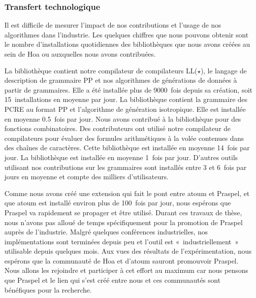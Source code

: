 \subsubsection{Transfert technologique}

Il est difficile de mesurer l'impact de nos contributions et l'usage de nos
algorithmes dans l'industrie. Les quelques chiffres que nous pouvons obtenir
sont le nombre d'installations quotidiennes des bibliothèques que nous avons
créées au sein de Hoa ou auxquelles nous avons contribuées.

La bibliothèque  contient notre compilateur de
compilateurs LL($\star$), le langage de description de grammaire PP et nos
algorithmes de générations de données à partir de grammaires. Elle a été
installée plus de 9000~fois depuis sa création, soit 15~installations en moyenne
par jour. La bibliothèque  contient la grammaire des
PCRE au format PP et l'algorithme de génération isotropique. Elle est installée
en moyenne 0.5~fois par jour. Nous avons contribué à la bibliothèque
 pour des fonctions combinatoires. Des contributeurs ont
utilisé notre compilateur de compilateurs pour évaluer des formules
arithmétiques à la volée contenues dans des chaînes de caractères. Cette
bibliothèque est installée en moyenne 14~fois par jour. La bibliothèque
 est installée en moyenne 1~fois par jour.  D'autres
outils utilisant nos contributions sur les grammaires sont installés entre 3 et
6~fois par jours en moyenne et compte des milliers d'utilisateurs. 

Comme nous avons créé une extension qui fait le pont entre atoum et Praspel, et
que atoum est installé environ plus de 100~fois par jour, nous espérons que
Praspel va rapidement se propager et être utilisé. Durant ces travaux de thèse,
nous n'avons pas alloué de temps spécifiquement pour la promotion de Praspel
auprès de l'industrie. Malgré quelques conférences industrielles, nos
implémentations sont terminées depuis peu et l'outil est «~industriellement~»
utilisable depuis quelques mois. Aux vues des résultats de l'expérimentation,
nous espérons que la communauté de Hoa et d'atoum sauront promouvoir Praspel.
Nous allons les rejoindre et participer à cet effort au maximum car nous pensons
que Praspel et le lien qui s'est créé entre nous et ces communautés sont
bénéfiques pour la recherche.
